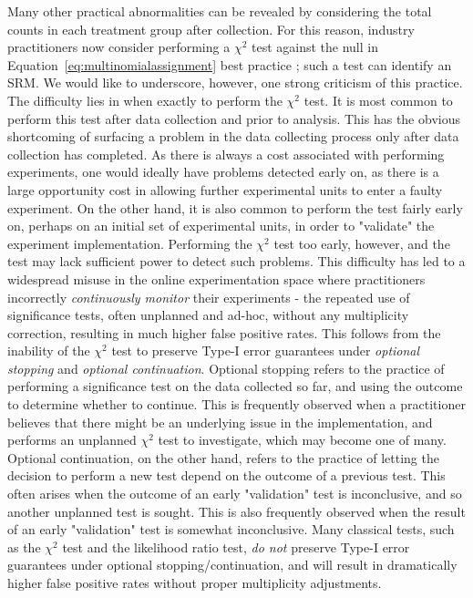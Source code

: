 \documentclass[11pt]{article}
\begin{document}
Many other practical abnormalities can be revealed by considering the total counts in each treatment group after collection.
For this reason, industry practitioners now consider performing a $\chi^2$ test against the null in Equation~\ref{eq:multinomialassignment} best practice \citep{linkedin}; such a test can identify an SRM.
We would like to underscore, however, one strong criticism of this practice.
The difficulty lies in when exactly to perform the $\chi^2$ test.
It is most common to perform this test after data collection and prior to analysis.
This has the obvious shortcoming of surfacing a problem in the data collecting process only after data collection has completed.
As there is always a cost associated with performing experiments, one would ideally have problems detected early on, as there is a large opportunity cost in allowing further experimental units to enter a faulty experiment.
On the other hand, it is also common to perform the test fairly early on, perhaps on an initial set of experimental units, in order to "validate" the experiment implementation.
Performing the $\chi^2$ test too early, however, and the test may lack sufficient power to detect such problems.
This difficulty has led to a widespread misuse in the online experimentation space where practitioners incorrectly \textit{continuously monitor} their experiments - the repeated use of significance tests, often unplanned and ad-hoc, without any multiplicity correction, resulting in much higher false positive rates.
This follows from the inability of the $\chi^2$ test to preserve Type-I error guarantees under \textit{optional stopping} and \textit{optional continuation}.
Optional stopping refers to the practice of performing a significance test on the data collected so far, and using the outcome to determine whether to continue.
This is frequently observed when a practitioner believes that there might be an underlying issue in the implementation, and performs an unplanned $\chi^2$ test to investigate,
which may become one of many.
Optional continuation, on the other hand, refers to the practice of letting the decision to perform a new test depend on the outcome of a previous test.
This often arises when the outcome of an early "validation" test is inconclusive, and so another unplanned test is sought.
This is also frequently observed when the result of an early "validation" test is somewhat inconclusive.
Many classical tests, such as the $\chi^2$ test and the likelihood ratio test, \textit{do not} preserve Type-I error guarantees under optional stopping/continuation,
and will result in dramatically higher false positive rates without proper multiplicity adjustments.
\end{document}
